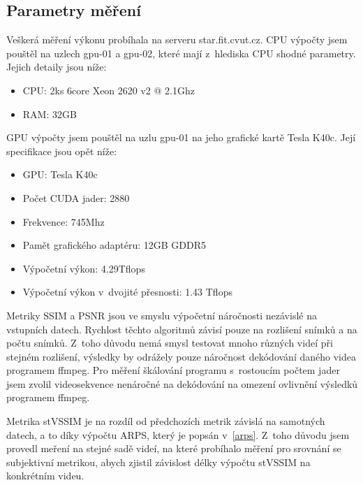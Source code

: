 \documentclass[thesis=M,czech]{FITthesis}[2016/06/26]
\begin{document}
\subsection{Parametry měření}
Veškerá měření výkonu probíhala na serveru star.fit.cvut.cz.
CPU výpočty jsem pouštěl na uzlech gpu-01 a gpu-02, které mají z~hlediska CPU shodné parametry. Jejich detaily jsou níže:
\begin{itemize}
\item CPU: 2ks 6core Xeon 2620 v2 @ 2.1Ghz
\item RAM: 32GB
\end{itemize}
GPU výpočty jsem pouštěl na uzlu gpu-01 na jeho grafické kartě Tesla K40c. Její specifikace jsou opět níže:
\begin{itemize}
\item GPU: Tesla K40c
\item Počet CUDA jader: 2880
\item Frekvence: 745Mhz
\item Pamět grafického adaptéru: 12GB GDDR5
\item Výpočetní výkon: 4.29Tflops
\item Výpočetní výkon v~dvojité přesnosti: 1.43 Tflops
\end{itemize}
Metriky SSIM a PSNR jsou ve smyslu výpočetní náročnosti nezávislé na vstupních datech. Rychlost těchto algoritmů závisí pouze na rozlišení snímků a na počtu snímků. Z~toho důvodu nemá smysl testovat mnoho různých videí při stejném rozlišení, výsledky by odrážely pouze náročnost dekódování daného videa programem ffmpeg. Pro měření škálování programu s~rostoucím počtem jader jsem zvolil videosekvence nenáročné na dekódování na omezení ovlivnění výsledků programem ffmpeg.

Metrika stVSSIM je na rozdíl od předchozích metrik závislá na samotných datech, a to díky výpočtu ARPS, který je popsán v~\autoref{arps}. Z~toho důvodu jsem provedl meření na stejné sadě videí, na které probíhalo měření pro srovnání se subjektivní metrikou, abych zjistil závislost délky výpočtu stVSSIM na konkrétním videu.
\end{document}
